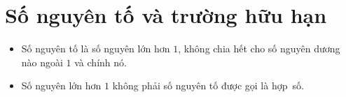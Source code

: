 \section{Số nguyên tố và trường hữu hạn}
\begin{frame}
  \begin{dfntn}
    \begin{itemize}
    \item<+-> \alert{Số nguyên tố} là số nguyên lớn hơn $1$, không chia hết
      cho số nguyên dương nào ngoài $1$ và chính nó.
    \item<+-> Số nguyên lớn hơn
      $1$ không phải số nguyên tố được gọi là \alert{hợp~số}.
    \end{itemize}
  \end{dfntn}
\end{frame}

